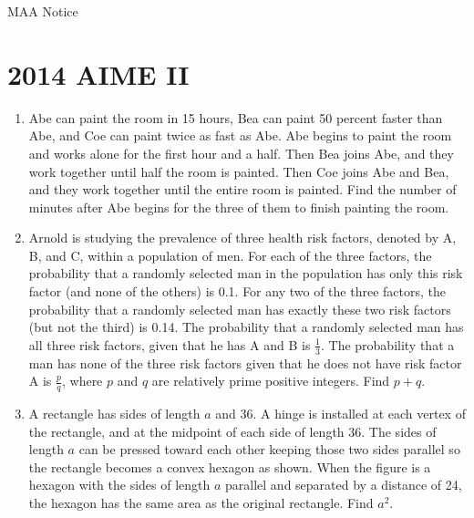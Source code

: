 \documentclass{article}
\begin{document}
\begin{enumerate}[label=\arabic*., itemsep=0.5em]
{{MAA Notice}}\par \vspace{0.5em}\end{enumerate}\newpage\section*{2014 AIME II}\begin{enumerate}[label=\arabic*., itemsep=0.5em]\item Abe can paint the room in 15 hours, Bea can paint 50 percent faster than Abe, and Coe can paint twice as fast as Abe. Abe begins to paint the room and works alone for the first hour and a half. Then Bea joins Abe, and they work together until half the room is painted. Then Coe joins Abe and Bea, and they work together until the entire room is painted. Find the number of minutes after Abe begins for the three of them to finish painting the room.\par \vspace{0.5em}\item Arnold is studying the prevalence of three health risk factors, denoted by A, B, and C, within a population of men. For each of the three factors, the probability that a randomly selected man in the population has only this risk factor (and none of the others) is 0.1. For any two of the three factors, the probability that a randomly selected man has exactly these two risk factors (but not the third) is 0.14. The probability that a randomly selected man has all three risk factors, given that he has A and B is $\frac{1}{3}$. The probability that a man has none of the three risk factors given that he does not have risk factor A is $\frac{p}{q}$, where $p$ and $q$ are relatively prime positive integers. Find $p+q$.\par \vspace{0.5em}\item A rectangle has sides of length $a$ and 36. A hinge is installed at each vertex of the rectangle, and at the midpoint of each side of length 36. The sides of length $a$ can be pressed toward each other keeping those two sides parallel so the rectangle becomes a convex hexagon as shown. When the figure is a hexagon with the sides of length $a$ parallel and separated by a distance of 24, the hexagon has the same area as the original rectangle. Find $a^2$. 




\end{enumerate}
\end{document}
